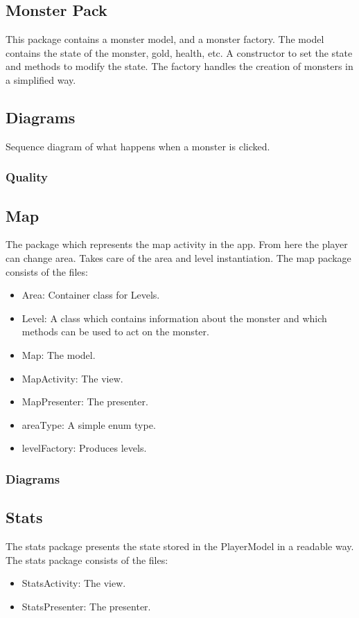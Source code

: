 \documentclass{article}
\begin{document}
\subsection{Monster Pack}
This package contains a monster model, and a monster factory. The model contains the state of the monster, gold, health, etc. A constructor to set the state and methods
to modify the state. The factory handles the creation of monsters in a simplified way.

\subsection{Diagrams}
\begin{center}
    Sequence diagram of what happens when a monster is clicked.\\
\end{center}

\subsubsection{Quality}

\subsection{Map}
The package which represents the map activity in the app. From here the player can change area. Takes care of the area and level instantiation.
The map package consists of the files:
\begin{itemize}
    \item Area: Container class for Levels.
    \item Level: A class which contains information about the monster and which methods can be used to act on the monster.
    \item Map: The model.
    \item MapActivity: The view.
    \item MapPresenter: The presenter.
    \item areaType: A simple enum type.
    \item levelFactory: Produces levels.
\end{itemize}

\subsubsection{Diagrams}

\subsection{Stats}
The stats package presents the state stored in the PlayerModel in a readable way.\\
The stats package consists of the files:
\begin{itemize}
    \item StatsActivity: The view.
    \item StatsPresenter: The presenter.
\end{itemize}
\end{document}
